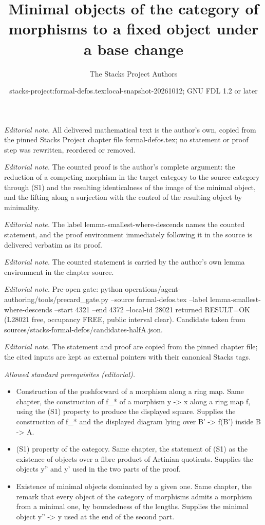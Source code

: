 \documentclass[10pt,a4paper]{amsart}
\title{Minimal objects of the category of morphisms to a fixed object under a base change}
\author{The Stacks Project Authors}
\date{stacks-project:formal-defos.tex:local-snapshot-20261012; GNU FDL 1.2 or later}
\theoremstyle{plain}
\theoremstyle{definition}
\theoremstyle{remark}
\numberwithin{equation}{subsection}
\begin{document}
\maketitle
\noindent\textit{Editorial note.} All delivered mathematical text is the author's own, copied from the pinned Stacks Project chapter file formal-defos.tex; no statement or proof step was rewritten, reordered or removed.\par\medskip
\noindent\textit{Editorial note.} The counted proof is the author's complete argument: the reduction of a competing morphism in the target category to the source category through (S1) and the resulting identicalness of the image of the minimal object, and the lifting along a surjection with the control of the resulting object by minimality.\par\medskip
\noindent\textit{Editorial note.} The label lemma-smallest-where-descends names the counted statement, and the proof environment immediately following it in the source is delivered verbatim as its proof.\par\medskip
\noindent\textit{Editorial note.} The counted statement is carried by the author's own lemma environment in the chapter source.\par\medskip
\noindent\textit{Editorial note.} Pre-open gate: python operations/agent-authoring/tools/precard\_gate.py --source formal-defos.tex --label lemma-smallest-where-descends --start 4321 --end 4372 --local-id 28021 returned RESULT=OK (L28021 free, occupancy FREE, public interval clear). Candidate taken from sources/stacks-formal-defos/candidates-halfA.json.\par\medskip
\noindent\textit{Editorial note.} The statement and proof are copied from the pinned chapter file; the cited inputs are kept as external pointers with their canonical Stacks tags.\par\medskip
\noindent\textit{Allowed standard prerequisites (editorial).}\begin{itemize}
\item Construction of the pushforward of a morphism along a ring map. Same chapter, the construction of f\_* of a morphism y -> x along a ring map f, using the (S1) property to produce the displayed square. Supplies the construction of f\_* and the displayed diagram lying over B' -> f(B') inside B -> A.
\item (S1) property of the category. Same chapter, the statement of (S1) as the existence of objects over a fibre product of Artinian quotients. Supplies the objects y'' and y' used in the two parts of the proof.
\item Existence of minimal objects dominated by a given one. Same chapter, the remark that every object of the category of morphisms admits a morphism from a minimal one, by boundedness of the lengths. Supplies the minimal object y'' -> y used at the end of the second part.
\end{itemize}\medskip
\end{document}

